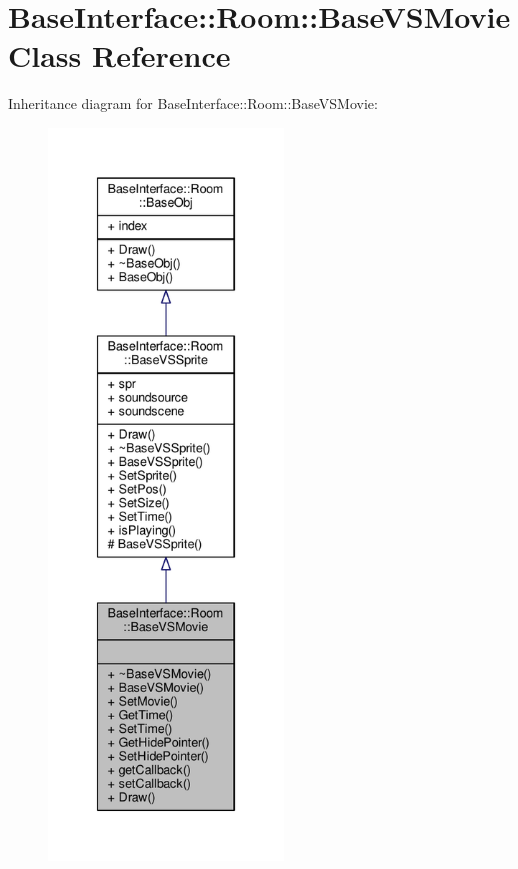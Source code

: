 \hypertarget{classBaseInterface_1_1Room_1_1BaseVSMovie}{}\section{Base\+Interface\+:\+:Room\+:\+:Base\+V\+S\+Movie Class Reference}
\label{classBaseInterface_1_1Room_1_1BaseVSMovie}


Inheritance diagram for Base\+Interface\+:\+:Room\+:\+:Base\+V\+S\+Movie\+:
\nopagebreak
\begin{figure}[H]
\begin{center}
\leavevmode
\includegraphics[height=550pt]{de/d50/classBaseInterface_1_1Room_1_1BaseVSMovie__inherit__graph}
\end{center}
\end{figure}


